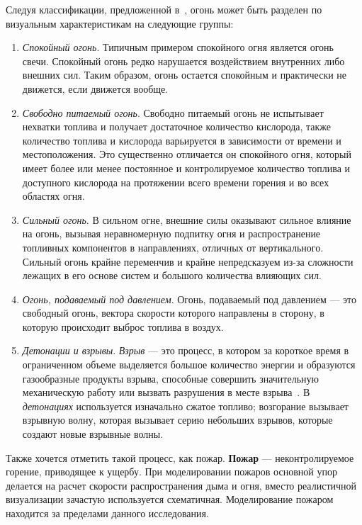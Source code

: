 Следуя классификации, предложенной в~\cite{nielsen}, огонь может быть разделен
по визуальным характеристикам на следующие группы:
\begin{enumerate}
    \item \emph{Спокойный огонь}. Типичным примером спокойного огня
        является \break{} огонь свечи. Спокойный огонь редко нарушается
        воздействием внутренних либо внешних сил. Таким образом, огонь остается
        спокойным и практически не движется, если движется вообще.

    \item \emph{Свободно питаемый огонь}. Свободно питаемый огонь не
        испытывает нехватки топлива и получает достаточное количество кислорода,
        также количество топлива и кислорода варьируется в зависимости от
        времени и местоположения. Это существенно отличается он спокойного огня,
        который имеет более или менее постоянное и контролируемое количество
        топлива и доступного кислорода на протяжении всего времени горения и во
        всех областях огня.

    \item \emph{Сильный огонь}. В сильном огне, внешние силы оказывают сильное
        влияние на огонь, вызывая неравномерную подпитку огня и распространение
        топливных компонентов в направлениях, отличных от вертикального. Сильный
        огонь крайне переменчив и крайне непредсказуем из-за сложности лежащих в
        его основе систем и большого количества влияющих сил.

    \item \emph{Огонь, подаваемый под давлением}. Огонь, подаваемый под
        давлением --- это свободный огонь, вектора скорости которого направлены
        в сторону, в которую происходит выброс топлива в воздух.

    \item \emph{Детонации и взрывы}. \emph{Взрыв} — это процесс, в котором за
        короткое время в ограниченном объеме выделяется большое количество
        энергии и образуются газообразные продукты взрыва, способные совершить
        значительную механическую работу или вызвать разрушения в месте
        взрыва~\cite{WikiDetonation}. В \emph{детонациях} используется изначально
        сжатое топливо; возгорание вызывает взрывную волну, которая вызывает
        серию небольших взрывов, которые создают новые взрывные волны.
\end{enumerate}

Также хочется отметить такой процесс, как пожар. \textbf{Пожар} ---
неконтролируемое горение, приводящее к ущербу. При моделировании пожаров
основной упор делается на расчет скорости распространения дыма и огня, вместо
реалистичной визуализации зачастую используется схематичная. Моделирование
пожаром находится за пределами данного исследования.

